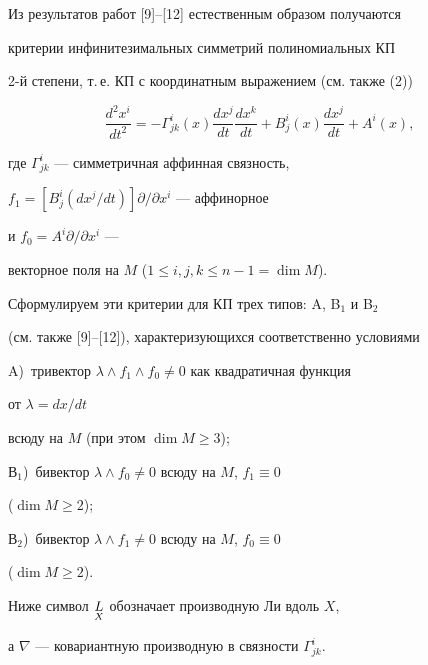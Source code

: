  


Из результатов работ [9]--[12] естественным образом получаются 


критерии инфинитезимальных симметрий полиномиальных КП 


2-й степени, т.\,е. КП с координатным выражением (см. также (2)) 


$$ 


\frac{d^2x^i}{dt^2}=-\Gamma^i_{j k}(x) 


\frac{dx^j}{dt}\frac{dx^k}{dt}+B^i_j(x) 


\frac{dx^j}{dt}+A^i(x),


$$ 


где $\Gamma^i_{j k}$ --- симметричная аффинная связность, 


$f_1=[B^i_j(dx^j/dt)]\partial/\partial x^i$ --- аффинорное 


и $f_0=A^i\partial/\partial x^i$ --- 


векторное поля на $M$ ($1\le i,j,k\le n-1=\dim M$). 


 


Сформулируем эти критерии для КП трех типов: A, B$_1$ и B$_2$ 


(см. также [9]--[12]), характеризующихся соответственно условиями 


A)~тривектор $\lambda\wedge f_1\wedge f_0\ne0$ как квадратичная функция 


от $\lambda=dx/dt$ 


всюду на $M$ (при этом $\dim M\ge3$); 


В$_1$)~бивектор $\lambda\wedge f_0\ne0$ всюду на $M$, $f_1\equiv0$ 


($\dim M\ge2$); 


В$_2$)~бивектор $\lambda\wedge f_1\ne0$ всюду на $M$, $f_0\equiv0$ 


($\dim M\ge 2$). 


 


Ниже символ $\underset{X}{L}{}$ обозначает производную Ли вдоль $X$, 


а $\nabla$ --- ковариантную производную в связности $\Gamma^i_{j k}$. 


 


